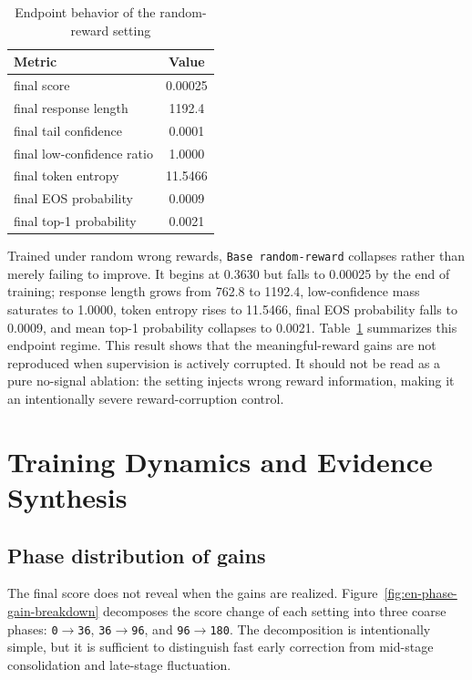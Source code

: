 \documentclass[12pt,a4paper]{ctexart}
\begin{document}
\begin{table}[H]
    \centering
    \caption{Endpoint behavior of the random-reward setting}
    \label{tab:en-random-reward-endpoint}
    \begin{tabular}{lc}
        \toprule
        Metric & Value \\
        \midrule
        final score & 0.00025 \\
        final response length & 1192.4 \\
        final tail confidence & 0.0001 \\
        final low-confidence ratio & 1.0000 \\
        final token entropy & 11.5466 \\
        final EOS probability & 0.0009 \\
        final top-1 probability & 0.0021 \\
        \bottomrule
    \end{tabular}
\end{table}

Trained under random wrong rewards, \texttt{Base random-reward} collapses rather than merely failing to improve. It begins at 0.3630 but falls to 0.00025 by the end of training; response length grows from 762.8 to 1192.4, low-confidence mass saturates to 1.0000, token entropy rises to 11.5466, final EOS probability falls to 0.0009, and mean top-1 probability collapses to 0.0021. Table~\ref{tab:en-random-reward-endpoint} summarizes this endpoint regime. This result shows that the meaningful-reward gains are not reproduced when supervision is actively corrupted. It should not be read as a pure no-signal ablation: the setting injects wrong reward information, making it an intentionally severe reward-corruption control.

\section{Training Dynamics and Evidence Synthesis}

\subsection{Phase distribution of gains}

The final score does not reveal when the gains are realized. Figure~\ref{fig:en-phase-gain-breakdown} decomposes the score change of each setting into three coarse phases: \texttt{0$\rightarrow$36}, \texttt{36$\rightarrow$96}, and \texttt{96$\rightarrow$180}. The decomposition is intentionally simple, but it is sufficient to distinguish fast early correction from mid-stage consolidation and late-stage fluctuation.
\end{document}
